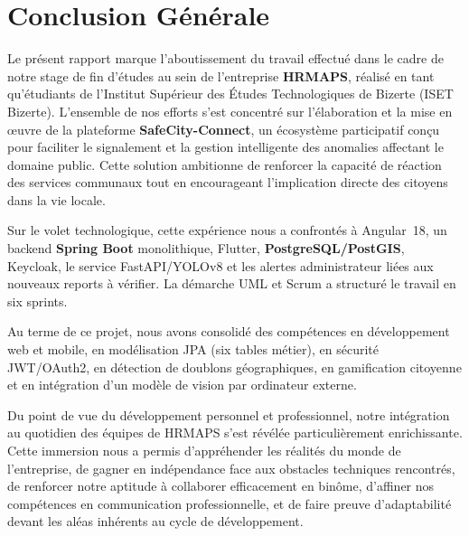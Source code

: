 
\chapter*{Conclusion Générale}

Le présent rapport marque l'aboutissement du travail effectué dans le cadre de notre stage de fin d'études au sein de l'entreprise \textbf{HRMAPS}, réalisé en tant qu'étudiants de l'Institut Supérieur des Études Technologiques de Bizerte (ISET Bizerte). L'ensemble de nos efforts s'est concentré sur l'élaboration et la mise en œuvre de la plateforme \textbf{SafeCity-Connect}, un écosystème participatif conçu pour faciliter le signalement et la gestion intelligente des anomalies affectant le domaine public. Cette solution ambitionne de renforcer la capacité de réaction des services communaux tout en encourageant l'implication directe des citoyens dans la vie locale.

Sur le volet technologique, cette expérience nous a confrontés à Angular~18, un backend \textbf{Spring Boot} monolithique, Flutter, \textbf{PostgreSQL/PostGIS}, Keycloak, le service FastAPI/YOLOv8 et les alertes administrateur liées aux nouveaux reports à vérifier. La démarche UML et Scrum a structuré le travail en six sprints.

Au terme de ce projet, nous avons consolidé des compétences en développement web et mobile, en modélisation JPA (six tables métier), en sécurité JWT/OAuth2, en détection de doublons géographiques, en gamification citoyenne et en intégration d'un modèle de vision par ordinateur externe.

Du point de vue du développement personnel et professionnel, notre intégration au quotidien des équipes de HRMAPS s'est révélée particulièrement enrichissante. Cette immersion nous a permis d'appréhender les réalités du monde de l'entreprise, de gagner en indépendance face aux obstacles techniques rencontrés, de renforcer notre aptitude à collaborer efficacement en binôme, d'affiner nos compétences en communication professionnelle, et de faire preuve d'adaptabilité devant les aléas inhérents au cycle de développement.

